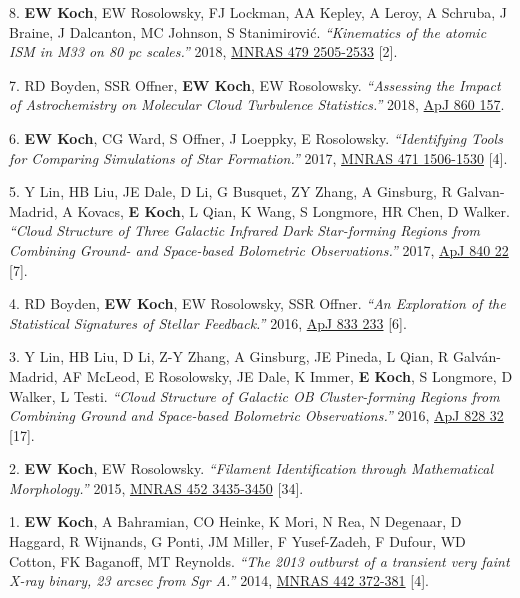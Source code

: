 \documentclass[letterpaper,11pt]{article}
\newenvironment{publist}{
  \begingroup
  \raggedright
  \begin{description}[leftmargin=4ex,style=sameline]
}{
  \end{description}
  \endgroup
}
\begin{document}
\begin{publist}
\item[8.] \textbf{EW Koch}, EW Rosolowsky, FJ Lockman, AA Kepley, A Leroy, A Schruba, J Braine, J Dalcanton, MC Johnson, S Stanimirovi\'{c}. \textit{``Kinematics of the atomic ISM in M33 on 80 pc scales.''} 2018, \href{http://adsabs.harvard.edu/abs/2018MNRAS.479.2505K}{MNRAS 479 2505-2533} [2].
\item[7.] RD Boyden, SSR Offner, \textbf{EW Koch}, EW Rosolowsky. \textit{``Assessing the Impact of Astrochemistry on Molecular Cloud Turbulence Statistics.''} 2018, \href{http://adsabs.harvard.edu/abs/2018ApJ...860..157B}{ApJ 860 157}.
\item[6.] \textbf{EW Koch}, CG Ward, S Offner, J Loeppky, E Rosolowsky. \textit{``Identifying Tools for Comparing Simulations of Star Formation.''} 2017, \href{http://adsabs.harvard.edu/abs/2017MNRAS.471.1506K}{MNRAS 471 1506-1530} [4].
\item[5.] Y Lin, HB Liu, JE Dale, D Li, G Busquet, ZY Zhang, A Ginsburg, R Galvan-Madrid, A Kovacs, \textbf{E Koch}, L Qian, K Wang, S Longmore, HR Chen, D Walker. \textit{``Cloud Structure of Three Galactic Infrared Dark Star-forming Regions from Combining Ground- and Space-based Bolometric Observations.''} 2017, \href{http://adsabs.harvard.edu/abs/2017ApJ...840...22L}{ApJ 840 22} [7].
\item[4.] RD Boyden, \textbf{EW Koch}, EW Rosolowsky, SSR Offner. \textit{``An Exploration of the Statistical Signatures of Stellar Feedback.''} 2016, \href{http://adsabs.harvard.edu/abs/2016ApJ...833..233B}{ApJ 833 233} [6].
\item[3.] Y Lin, HB Liu, D Li, Z-Y Zhang, A Ginsburg, JE Pineda, L Qian, R Galv\'{a}n-Madrid, AF McLeod, E Rosolowsky, JE Dale, K Immer, \textbf{E Koch}, S Longmore, D Walker, L Testi. \textit{``Cloud Structure of Galactic OB Cluster-forming Regions from Combining Ground and Space-based Bolometric Observations.''} 2016, \href{http://adsabs.harvard.edu/abs/2016ApJ...828...32L}{ApJ 828 32} [17].
\item[2.] \textbf{EW Koch}, EW Rosolowsky. \textit{``Filament Identification through Mathematical Morphology.''} 2015, \href{http://adsabs.harvard.edu/abs/2015MNRAS.452.3435K}{MNRAS 452 3435-3450} [34].
\item[1.] \textbf{EW Koch}, A Bahramian, CO Heinke, K Mori, N Rea, N Degenaar, D Haggard, R Wijnands, G Ponti, JM Miller, F Yusef-Zadeh, F Dufour, WD Cotton, FK Baganoff, MT Reynolds. \textit{``The 2013 outburst of a transient very faint X-ray binary, 23 arcsec from Sgr A\textasteriskcentered.''} 2014, \href{http://adsabs.harvard.edu/abs/2014MNRAS.442..372K}{MNRAS 442 372-381} [4].
\end{publist}
\end{document}
